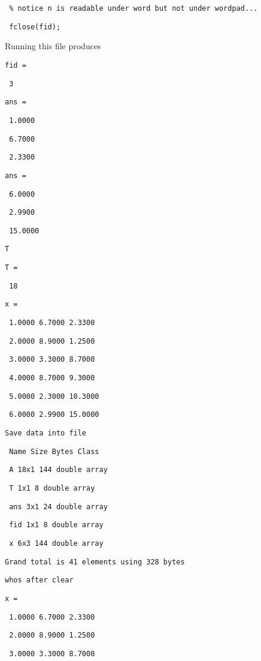 \documentclass[12pt,a4paper]{article}
\begin{document}
\texttt{\ \% notice \TEXTsymbol{\backslash}n is readable under word but not
under wordpad...}

\texttt{\ fclose(fid);}

\bigskip

Running this file produces

\texttt{fid =}

\texttt{\ 3}

\texttt{ans =}

\texttt{\ 1.0000}

\texttt{\ 6.7000}

\texttt{\ 2.3300}

\texttt{ans =}

\texttt{\ 6.0000}

\texttt{\ 2.9900}

\texttt{\ 15.0000}

\texttt{T}

\texttt{T =}

\texttt{\ 18}

\texttt{x =}

\texttt{\ 1.0000 6.7000 2.3300}

\texttt{\ 2.0000 8.9000 1.2500}

\texttt{\ 3.0000 3.3000 8.7000}

\texttt{\ 4.0000 8.7000 9.3000}

\texttt{\ 5.0000 2.3000 10.3000}

\texttt{\ 6.0000 2.9900 15.0000}

\texttt{Save data into file}

\texttt{\ Name Size Bytes Class}

\texttt{\ A 18x1 144 double array}

\texttt{\ T 1x1 8 double array}

\texttt{\ ans 3x1 24 double array}

\texttt{\ fid 1x1 8 double array}

\texttt{\ x 6x3 144 double array}

\texttt{Grand total is 41 elements using 328 bytes}

\bigskip

\texttt{whos after clear}

\bigskip

\texttt{x =}

\texttt{\ 1.0000 6.7000 2.3300}

\texttt{\ 2.0000 8.9000 1.2500}

\texttt{\ 3.0000 3.3000 8.7000}
\end{document}
